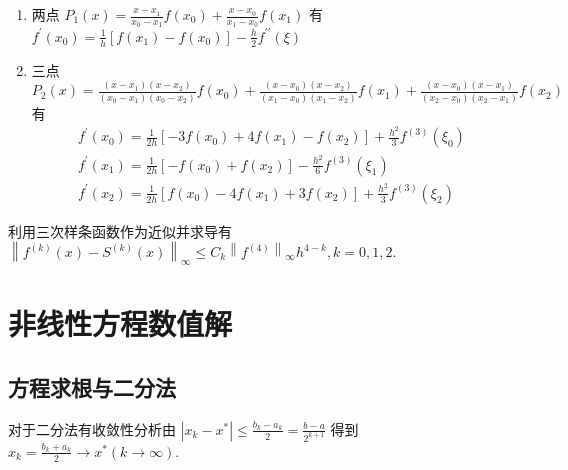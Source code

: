 \documentclass[10pt]{yerbaformat}
\begin{document}
\begin{enumerate}
    \item 两点 $P_{1}(x)=\frac{x-x_{1}}{x_{0}-x_{1}} f\left(x_{0}\right)+\frac{x-x_{0}}{x_{1}-x_{0}} f\left(x_{1}\right)$ 有 $f^{\prime}\left(x_{0}\right)=\frac{1}{h}\left[f\left(x_{1}\right)-f\left(x_{0}\right)\right]-\frac{h}{2} f^{\prime \prime}(\xi)$
    \item 三点 $P_{2}(x)=\frac{\left(x-x_{1}\right)\left(x-x_{2}\right)}{\left(x_{0}-x_{1}\right)\left(x_{0}-x_{2}\right)} f\left(x_{0}\right)+\frac{\left(x-x_{0}\right)\left(x-x_{2}\right)}{\left(x_{1}-x_{0}\right)\left(x_{1}-x_{2}\right)} f\left(x_{1}\right)+\frac{\left(x-x_{0}\right)\left(x-x_{1}\right)}{\left(x_{2}-x_{0}\right)\left(x_{2}-x_{1}\right)} f\left(x_{2}\right)$ 有
    $$
        \begin{array}{l}
            f^{\prime}\left(x_{0}\right)=\frac{1}{2 h}\left[-3 f\left(x_{0}\right)+4 f\left(x_{1}\right)-f\left(x_{2}\right)\right]+\frac{h^{2}}{3} f^{(3)}\left(\xi_{0}\right) \\
            f^{\prime}\left(x_{1}\right)=\frac{1}{2 h}\left[-f\left(x_{0}\right)+f\left(x_{2}\right)\right]-\frac{h^{2}}{6} f^{(3)}\left(\xi_{1}\right)                         \\
            f^{\prime}\left(x_{2}\right)=\frac{1}{2 h}\left[f\left(x_{0}\right)-4 f\left(x_{1}\right)+3 f\left(x_{2}\right)\right]+\frac{h^{2}}{3} f^{(3)}\left(\xi_{2}\right)
        \end{array}
    $$
\end{enumerate}

\par 利用三次样条函数作为近似并求导有 $\left\|f^{(k)}(x)-S^{(k)}(x)\right\|_{\infty} \leq C_{k}\left\|f^{(4)}\right\|_{\infty} h^{4-k}, k=0,1,2$.

\section{非线性方程数值解}
\subsection{方程求根与二分法}

\par 对于二分法有收敛性分析由 $\left|x_{k}-x^{*}\right| \leq \frac{b_{k}-a_{k}}{2}=\frac{b-a}{2^{k+1}}$ 得到 $x_{k}=\frac{b_{k}+a_{k}}{2} \rightarrow x^{*}(k \rightarrow \infty)$.
\end{document}
